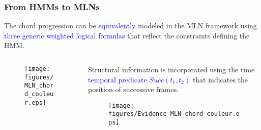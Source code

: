 \documentclass[12pt]{beamer}
\begin{document}
\begin{frame}
\frametitle{From HMMs to MLNs}

The chord progression can be \textcolor{blue}{equivalently} modeled in
the MLN framework using \textcolor{blue}{three generic weighted
  logical formulas} that reflect the constraints defining the HMM.
\medskip 

\begin{columns}[c] 

\begin{column}{0.62\textwidth} 
\vspace{-2.0cm}
\begin{figure}[htb]
   \centering
   \texttt{[image: figures/MLN\_chord\_couleur.eps]}\vspace{-0.2cm}
\end{figure}
\end{column} 


\begin{column}{0.38\textwidth} 
Structural information is incorporated using the time \textcolor{blue}{temporal predicate $Succ(t_{1},t_{2})$} that indicates the position of successive frames.

\vspace{-0.5cm}
\begin{figure}[htb]
   \centering
   \texttt{[image: figures/Evidence\_MLN\_chord\_couleur.eps]}%
\end{figure}

\end{column} 

\end{columns} 




\end{frame}

\end{document}
